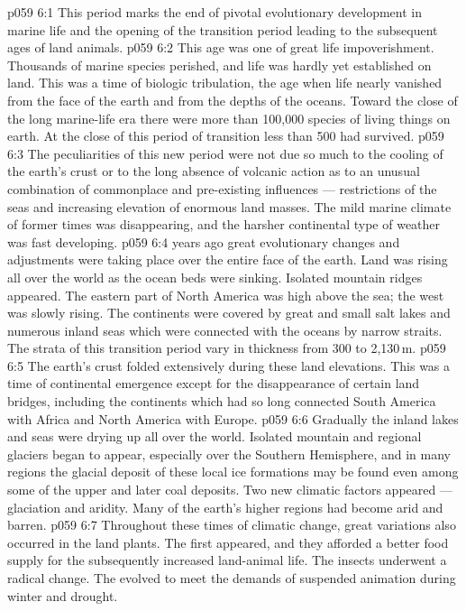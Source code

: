 \vs p059 6:1 This period marks the end of pivotal evolutionary development in marine life and the opening of the transition period leading to the subsequent ages of land animals.
\vs p059 6:2 This age was one of great life impoverishment. Thousands of marine species perished, and life was hardly yet established on land. This was a time of biologic tribulation, the age when life nearly vanished from the face of the earth and from the depths of the oceans. Toward the close of the long marine\hyp{}life era there were more than 100,000 species of living things on earth. At the close of this period of transition less than 500 had survived.
\vs p059 6:3 The peculiarities of this new period were not due so much to the cooling of the earth’s crust or to the long absence of volcanic action as to an unusual combination of commonplace and pre\hyp{}existing influences --- restrictions of the seas and increasing elevation of enormous land masses. The mild marine climate of former times was disappearing, and the harsher continental type of weather was fast developing.
\vs p059 6:4 \pc {} years ago great evolutionary changes and adjustments were taking place over the entire face of the earth. Land was rising all over the world as the ocean beds were sinking. Isolated mountain ridges appeared. The eastern part of North America was high above the sea; the west was slowly rising. The continents were covered by great and small salt lakes and numerous inland seas which were connected with the oceans by narrow straits. The strata of this transition period vary in thickness from 300 to 2,130\,m.
\vs p059 6:5 The earth’s crust folded extensively during these land elevations. This was a time of continental emergence except for the disappearance of certain land bridges, including the continents which had so long connected South America with Africa and North America with Europe.
\vs p059 6:6 Gradually the inland lakes and seas were drying up all over the world. Isolated mountain and regional glaciers began to appear, especially over the Southern Hemisphere, and in many regions the glacial deposit of these local ice formations may be found even among some of the upper and later coal deposits. Two new climatic factors appeared --- glaciation and aridity. Many of the earth’s higher regions had become arid and barren.
\vs p059 6:7 \pc Throughout these times of climatic change, great variations also occurred in the land plants. The  first appeared, and they afforded a better food supply for the subsequently increased land\hyp{}animal life. The insects underwent a radical change. The  evolved to meet the demands of suspended animation during winter and drought.
